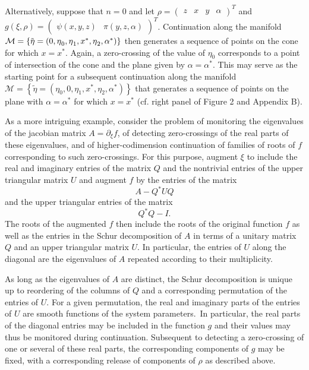 \documentclass{article}
\begin{document}
Alternatively, suppose that $n=0$ and let $\rho =\left( 
\begin{array}{cccc}
z & x & y & \alpha 
\end{array}%
\right) ^{T}$ and $g\left( \xi ,\rho \right) =\left( 
\begin{array}{cc}
\psi \left( x,y,z\right)  & \pi \left( y,z,\alpha \right) 
\end{array}%
\right) ^{T}$. Continuation along the manifold $\mathcal{M}=\left\{ \tilde{%
\eta}=\left( 0,\eta _{0},\eta _{1},x^{\ast },\eta _{2},\alpha ^{\ast
}\right) \right\} $ then generates a sequence of points on the cone for
which $x=x^{\ast }$. Again, a zero-crossing of the value of $\eta _{0}$
corresponds to a point of intersection of the cone and the plane given by $%
\alpha =\alpha ^{\ast }$. This may serve as the starting point for a
subsequent continuation along the manifold $\mathcal{M}=\left\{ \tilde{\eta}%
=\left( \eta _{0},0,\eta _{1},x^{\ast },\eta _{2},\alpha ^{\ast }\right)
\right\} $ that generates a sequence of points on the plane with $\alpha
=\alpha ^{\ast }$ for which $x=x^{\ast }$ (cf. right panel of Figure 2 and
Appendix B).

As a more intriguing example, consider the problem of monitoring the
eigenvalues of the jacobian matrix $A=\partial _{\xi }f$, of detecting
zero-crossings of the real parts of these eigenvalues, and of
higher-codimension continuation of families of roots of $f$ corresponding to
such zero-crossings. For this purpose, augment $\xi $ to include the real
and imaginary entries of the matrix $Q$ and the nontrivial entries of the
upper triangular matrix $U$ and augment $f$ by the entries of the matrix%
\[
A-Q^{\ast }UQ 
\]%
and the upper triangular entries of the matrix%
\[
Q^{\ast }Q-I. 
\]%
The roots of the augmented $f$ then include the roots of the original
function $f$ as well as the entries in the Schur decomposition of $A$ in
terms of a unitary matrix $Q$ and an upper triangular matrix $U$. In
particular, the entries of $U$ along the diagonal are the eigenvalues of $A$
repeated according to their multiplicity.

As long as the eigenvalues of $A$ are distinct, the Schur decomposition is
unique up to reordering of the columns of $Q$ and a corresponding
permutation of the entries of $U$. For a given permutation, the real and
imaginary parts of the entries of $U$ are smooth functions of the system
parameters.\ In particular, the real parts of the diagonal entries may be
included in the function $g$ and their values may thus be monitored during
continuation. Subsequent to detecting a zero-crossing of one or several of
these real parts, the corresponding components of $g$ may be fixed, with a
corresponding release of components of $\rho $ as described above.
\end{document}
